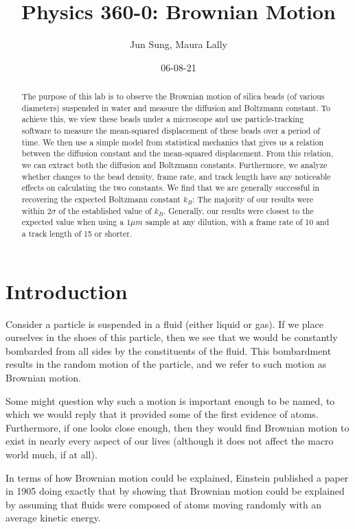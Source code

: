 \documentclass[twocolumn,amsmath,amssymb,pra, floatfix]{revtex4-2}
\begin{document}
\title{Physics 360-0: Brownian Motion}

\author{Jun Sung, Maura Lally}

\date{06-08-21}

\begin{abstract}
The purpose of this lab is to observe the Brownian motion of silica beads (of various diameters) suspended in water and measure the diffusion and Boltzmann constant. To achieve this, we view these beads under a microscope and use particle-tracking software to measure the mean-squared displacement of these beads over a period of time. We then use a simple model from statistical mechanics that gives us a relation between the diffusion constant and the mean-squared displacement. From this relation, we can extract both the diffusion and Boltzmann constants. Furthermore, we analyze whether changes to the bead density, frame rate, and track length have any noticeable effects on calculating the two constants. We find that we are generally successful in recovering the expected Boltzmann constant $k_B$: The majority of our results were within $2\sigma$ of the established value of $k_B$. Generally, our results were closest to the expected value when using a $1 \si{\mu m}$ sample at any dilution, with a frame rate of 10 and a track length of 15 or shorter.
\end{abstract}

\maketitle

\section{Introduction}
Consider a particle is suspended in a fluid (either liquid or gas). If we place ourselves in the shoes of this particle, then we see that we would be constantly bombarded from all sides by the constituents of the fluid. This bombardment results in the random motion of the particle, and we refer to such motion as Brownian motion.

Some might question why such a motion is important enough to be named, to which we would reply that it provided some of the first evidence of atoms. Furthermore, if one looks close enough, then they would find Brownian motion to exist in nearly every aspect of our lives (although it does not affect the macro world much, if at all).

In terms of how Brownian motion could be explained, Einstein published a paper in 1905 doing exactly that by showing that Brownian motion could be explained by assuming that fluids were composed of atoms moving randomly with an average kinetic energy.
\end{document}
